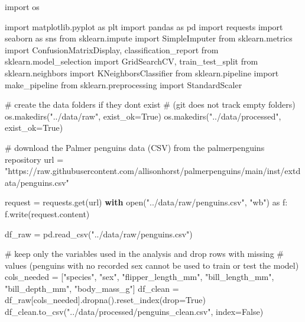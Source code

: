 \documentclass[
  letterpaper,
  DIV=11,
  numbers=noendperiod]{scrartcl}
\newenvironment{Shaded}{\begin{snugshade}}{\end{snugshade}}
\newcommand{\BuiltInTok}[1]{\textcolor[rgb]{0.00,0.23,0.31}{#1}}
\newcommand{\CommentTok}[1]{\textcolor[rgb]{0.37,0.37,0.37}{#1}}
\newcommand{\ControlFlowTok}[1]{\textcolor[rgb]{0.00,0.23,0.31}{\textbf{#1}}}
\newcommand{\ImportTok}[1]{\textcolor[rgb]{0.00,0.46,0.62}{#1}}
\newcommand{\NormalTok}[1]{\textcolor[rgb]{0.00,0.23,0.31}{#1}}
\newcommand{\OperatorTok}[1]{\textcolor[rgb]{0.37,0.37,0.37}{#1}}
\newcommand{\StringTok}[1]{\textcolor[rgb]{0.13,0.47,0.30}{#1}}
\newcommand{\VariableTok}[1]{\textcolor[rgb]{0.07,0.07,0.07}{#1}}
\begin{document}
\begin{Shaded}
\begin{Highlighting}[]
\ImportTok{import}\NormalTok{ os}

\ImportTok{import}\NormalTok{ matplotlib.pyplot }\ImportTok{as}\NormalTok{ plt}
\ImportTok{import}\NormalTok{ pandas }\ImportTok{as}\NormalTok{ pd}
\ImportTok{import}\NormalTok{ requests}
\ImportTok{import}\NormalTok{ seaborn }\ImportTok{as}\NormalTok{ sns}
\ImportTok{from}\NormalTok{ sklearn.impute }\ImportTok{import}\NormalTok{ SimpleImputer}
\ImportTok{from}\NormalTok{ sklearn.metrics }\ImportTok{import}\NormalTok{ ConfusionMatrixDisplay, classification\_report}
\ImportTok{from}\NormalTok{ sklearn.model\_selection }\ImportTok{import}\NormalTok{ GridSearchCV, train\_test\_split}
\ImportTok{from}\NormalTok{ sklearn.neighbors }\ImportTok{import}\NormalTok{ KNeighborsClassifier}
\ImportTok{from}\NormalTok{ sklearn.pipeline }\ImportTok{import}\NormalTok{ make\_pipeline}
\ImportTok{from}\NormalTok{ sklearn.preprocessing }\ImportTok{import}\NormalTok{ StandardScaler}

\CommentTok{\# create the data folders if they don\textquotesingle{}t exist}
\CommentTok{\# (git does not track empty folders)}
\NormalTok{os.makedirs(}\StringTok{"../data/raw"}\NormalTok{, exist\_ok}\OperatorTok{=}\VariableTok{True}\NormalTok{)}
\NormalTok{os.makedirs(}\StringTok{"../data/processed"}\NormalTok{, exist\_ok}\OperatorTok{=}\VariableTok{True}\NormalTok{)}

\CommentTok{\# download the Palmer penguins data (CSV) from the palmerpenguins repository}
\NormalTok{url }\OperatorTok{=} \StringTok{"https://raw.githubusercontent.com/allisonhorst/palmerpenguins/main/inst/extdata/penguins.csv"}

\NormalTok{request }\OperatorTok{=}\NormalTok{ requests.get(url)}
\ControlFlowTok{with} \BuiltInTok{open}\NormalTok{(}\StringTok{"../data/raw/penguins.csv"}\NormalTok{, }\StringTok{"wb"}\NormalTok{) }\ImportTok{as}\NormalTok{ f:}
\NormalTok{    f.write(request.content)}

\NormalTok{df\_raw }\OperatorTok{=}\NormalTok{ pd.read\_csv(}\StringTok{"../data/raw/penguins.csv"}\NormalTok{)}

\CommentTok{\# keep only the variables used in the analysis and drop rows with missing}
\CommentTok{\# values (penguins with no recorded sex cannot be used to train or test the model)}
\NormalTok{cols\_needed }\OperatorTok{=}\NormalTok{ [}\StringTok{"species"}\NormalTok{, }\StringTok{"sex"}\NormalTok{, }\StringTok{"flipper\_length\_mm"}\NormalTok{, }\StringTok{"bill\_length\_mm"}\NormalTok{,}
               \StringTok{"bill\_depth\_mm"}\NormalTok{, }\StringTok{"body\_mass\_g"}\NormalTok{]}
\NormalTok{df\_clean }\OperatorTok{=}\NormalTok{ df\_raw[cols\_needed].dropna().reset\_index(drop}\OperatorTok{=}\VariableTok{True}\NormalTok{)}
\NormalTok{df\_clean.to\_csv(}\StringTok{"../data/processed/penguins\_clean.csv"}\NormalTok{, index}\OperatorTok{=}\VariableTok{False}\NormalTok{)}
\end{Highlighting}
\end{Shaded}
\end{document}
